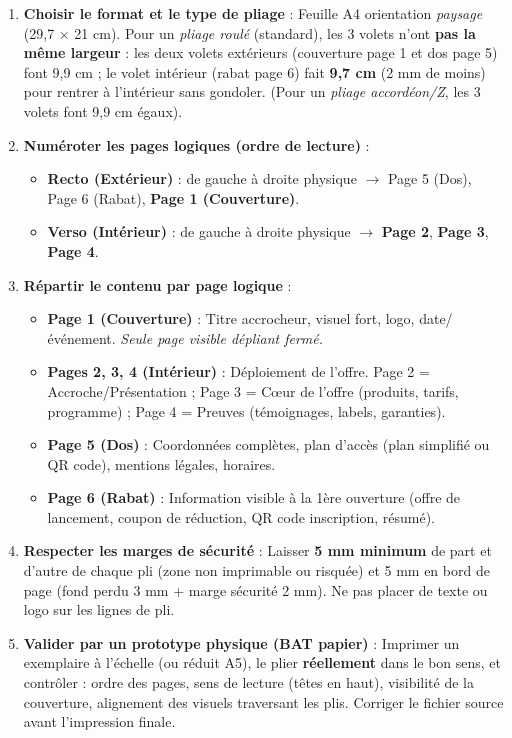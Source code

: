 \documentclass[11pt]{article}
\begin{document}
\begin{methode}
\begin{enumerate}
\item \textbf{Choisir le format et le type de pliage} : Feuille A4 orientation \emph{paysage} (29,7 $\times$ 21 cm). Pour un \emph{pliage roulé} (standard), les 3 volets n'ont \textbf{pas la même largeur} : les deux volets extérieurs (couverture page 1 et dos page 5) font 9,9 cm ; le volet intérieur (rabat page 6) fait \textbf{9,7 cm} (2 mm de moins) pour rentrer à l'intérieur sans gondoler. (Pour un \emph{pliage accordéon/Z}, les 3 volets font 9,9 cm égaux).
\item \textbf{Numéroter les pages logiques (ordre de lecture)} :
  \begin{itemize}
  \item \textbf{Recto (Extérieur)} : de gauche à droite physique $\rightarrow$ Page 5 (Dos), Page 6 (Rabat), \textbf{Page 1 (Couverture)}.
  \item \textbf{Verso (Intérieur)} : de gauche à droite physique $\rightarrow$ \textbf{Page 2}, \textbf{Page 3}, \textbf{Page 4}.
  \end{itemize}
\item \textbf{Répartir le contenu par page logique} :
  \begin{itemize}
  \item \textbf{Page 1 (Couverture)} : Titre accrocheur, visuel fort, logo, date/événement. \emph{Seule page visible dépliant fermé.}
  \item \textbf{Pages 2, 3, 4 (Intérieur)} : Déploiement de l'offre. Page 2 = Accroche/Présentation ; Page 3 = Cœur de l'offre (produits, tarifs, programme) ; Page 4 = Preuves (témoignages, labels, garanties).
  \item \textbf{Page 5 (Dos)} : Coordonnées complètes, plan d'accès (plan simplifié ou QR code), mentions légales, horaires.
  \item \textbf{Page 6 (Rabat)} : Information visible à la 1ère ouverture (offre de lancement, coupon de réduction, QR code inscription, résumé).
  \end{itemize}
\item \textbf{Respecter les marges de sécurité} : Laisser \textbf{5 mm minimum} de part et d'autre de chaque pli (zone non imprimable ou risquée) et 5 mm en bord de page (fond perdu 3 mm + marge sécurité 2 mm). Ne pas placer de texte ou logo sur les lignes de pli.
\item \textbf{Valider par un prototype physique (BAT papier)} : Imprimer un exemplaire à l'échelle (ou réduit A5), le plier \textbf{réellement} dans le bon sens, et contrôler : ordre des pages, sens de lecture (têtes en haut), visibilité de la couverture, alignement des visuels traversant les plis. Corriger le fichier source avant l'impression finale.
\end{enumerate}
\end{methode}
\end{document}
